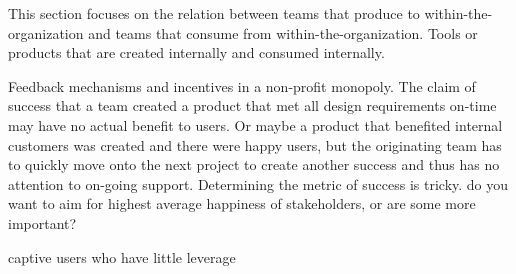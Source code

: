 This section focuses on the relation between teams that produce to within-the-organization and teams that consume from within-the-organization. Tools or products that are created internally and consumed internally.

Feedback mechanisms and incentives in a non-profit monopoly. The claim of success that a team created a product that met all design requirements on-time may have no actual benefit to users. Or maybe a product that benefited internal customers was created and there were happy users, but the originating team has to quickly move onto the next project to create another success and thus has no attention to on-going support. Determining the metric of success is tricky. do you want to aim for highest average happiness of stakeholders, or are some more important?

captive users who have little leverage 



